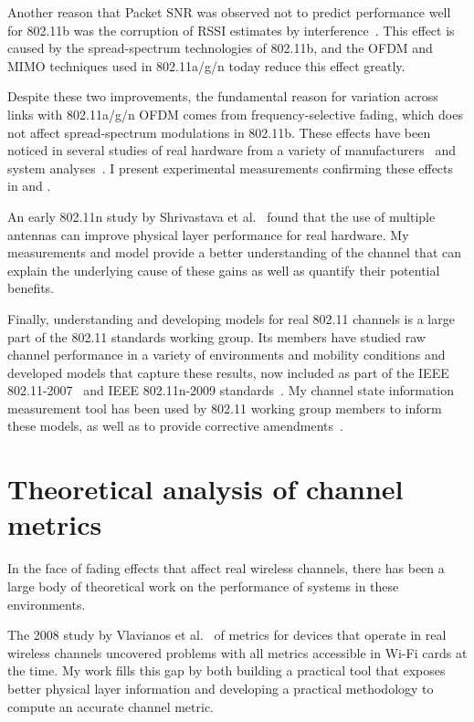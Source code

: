 Another reason that Packet SNR was observed not to predict performance well for 802.11b was the corruption of RSSI estimates by interference~\cite{Reis_interference,Vlavianos_metrics}. This effect is caused by the spread-spectrum technologies of 802.11b, and the OFDM and MIMO techniques used in 802.11a/g/n today reduce this effect greatly.

Despite these two improvements, the fundamental reason for variation across links with 802.11a/g/n OFDM comes from frequency-selective fading, which does not affect spread-spectrum modulations in 802.11b. These effects have been noticed in several studies of real hardware from a variety of manufacturers~\cite{Han_errors,Miu_MRD} and system analyses~\cite{Lampe_adaptation,Tse}. I present experimental measurements confirming these effects in  and .

An early 802.11n study by Shrivastava et al.~\cite{Shrivastava_80211n} found that the use of multiple antennas can improve physical layer performance for real hardware. My measurements and model provide a better understanding of the channel that can explain the underlying cause of these gains as well as quantify their potential benefits.

Finally, understanding and developing models for real 802.11 channels is a large part of the 802.11 standards working group. Its members have studied raw channel performance in a variety of environments and mobility conditions and developed models that capture these results, now included as part of the IEEE 802.11-2007~\cite{80211} and IEEE 802.11n-2009 standards~\cite{80211n}. My channel state information measurement tool has been used by 802.11 working group members to inform these models, as well as to provide corrective amendments~\cite{Perahia_Doppler}.

\section{Theoretical analysis of channel metrics}
In the face of fading effects that affect real wireless channels, there has been a large body of theoretical work on the performance of systems in these environments.

The 2008 study by Vlavianos et al.~\cite{Vlavianos_metrics} of metrics for devices that operate in real wireless channels uncovered problems with all metrics accessible in Wi-Fi cards at the time. My work fills this gap by both building a practical tool that exposes better physical layer information and developing a practical methodology to compute an accurate channel metric.

